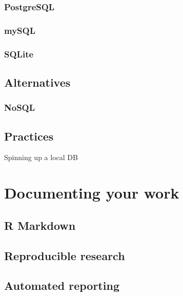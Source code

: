 \documentclass[
]{book}
\begin{document}
\hypertarget{postgresql}{%
\section{PostgreSQL}\label{postgresql}}

\hypertarget{mysql}{%
\section{mySQL}\label{mysql}}

\hypertarget{sqlite}{%
\section{SQLite}\label{sqlite}}

\hypertarget{alternatives}{%
\chapter{Alternatives}\label{alternatives}}

\hypertarget{nosql}{%
\section{NoSQL}\label{nosql}}

\hypertarget{practices}{%
\chapter{Practices}\label{practices}}

Spinning up a local DB

\hypertarget{part-documenting-your-work}{%
\part{Documenting your work}\label{part-documenting-your-work}}

\hypertarget{r-markdown}{%
\chapter{R Markdown}\label{r-markdown}}

\hypertarget{reproducible-research}{%
\chapter{Reproducible research}\label{reproducible-research}}

\hypertarget{automated-reporting}{%
\chapter{Automated reporting}\label{automated-reporting}}
\end{document}
